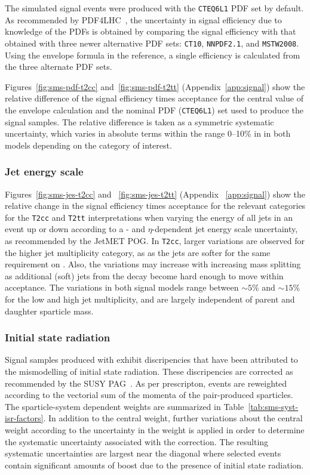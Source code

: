 The simulated signal events were produced with the \verb!CTEQ6L1! PDF
set by default.  As recommended by PDF4LHC~\cite{pdf4lhc}, the uncertainty
in signal efficiency due to knowledge of the PDFs is obtained by comparing 
the signal efficiency with that obtained with three newer alternative PDF 
sets: \verb!CT10!, \verb!NNPDF2.1!, and \verb!MSTW2008!. Using the envelope
formula in the reference, a single efficiency is calculated from the three alternate
PDF sets. 

Figures~\ref{fig:sms-pdf-t2cc} and~\ref{fig:sms-pdf-t2tt} 
(Appendix~\ref{app:signal}) show the relative difference of the signal 
efficiency times acceptance for the central value of the envelope calculation 
and the nominal PDF (\verb!CTEQ6L1!) set used to produce the signal 
samples. The relative difference is taken as a symmetric systematic 
uncertainty, which varies in absolute terms within the range 0--10\% in 
in both models depending on the category of interest.

\subsubsection{Jet energy scale\label{sec:sms-syst-jes}}

Figures~\ref{fig:sms-jes-t2cc} and ~\ref{fig:sms-jes-t2tt} 
(Appendix ~\ref{app:signal}) show the relative change in the 
signal efficiency times acceptance for the relevant categories for 
the \verb!T2cc! and \verb!T2tt! interpretations when varying the energy 
of all jets in an event up or down according to a \pt- and $\eta$-dependent 
jet energy scale uncertainty, as recommended by the JetMET POG. 
In \verb!T2cc!, larger variations are observed for the higher 
jet multiplicity category, as as the jets are softer for the same 
requirement on \scalht. Also, the variations may increase with 
increasing mass splitting as additional (soft) jets from the decay 
become hard enough to move within acceptance. The variations in both 
signal models range between $\sim5\%$ and $\sim15\%$ for the low 
and high jet multiplicity, and are largely independent of parent 
and daughter sparticle mass. 

\subsubsection{Initial state radiation\label{sec:sms-syst-isr}}

Signal samples produced with \MADGRAPH exhibit discripencies that 
have been attributed to the mismodelling of initial state radiation.
These discripencies are corrected as recommended by the SUSY 
PAG~\cite{susy-isrrw}. As per prescripton, events are reweighted
according to the vectorial sum of the momenta of the pair-produced
sparticles. The sparticle-system \Pt dependent weights are summarized in  
Table~\ref{tab:sms-syst-isr-factors}.   In addition to the central weight, 
further variations about the central weight according to the uncertainty 
in the weight is applied in order to determine the systematic uncertainty
associated with the correction. The resulting systematic uncertainties 
are largest near the diagonal where selected events contain significant 
amounts of boost due to the presence of initial state radiation. 

